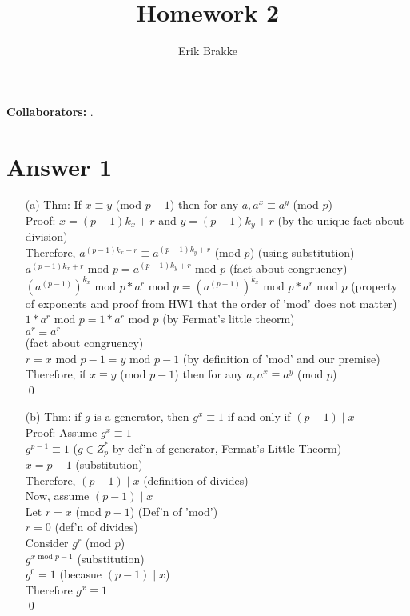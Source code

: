 \documentclass[11pt]{article}
\providecommand{\myparab}[1]{\smallskip\noindent\textbf{#1} }
\theoremstyle{definition}
\begin{document}
\title{Homework 2}
\author{Erik Brakke}
\maketitle

\thispagestyle{fancy}

\myparab{Collaborators: }  .
 
 
\section*{Answer 1}
\begin{enumerate}
	\item[(a)]
	Thm: If $x \equiv y$ (mod $p-1$) then for any $a, a^x \equiv a^y$ (mod $p$)\\
	\newline
	Proof:  $x = (p-1)k_x + r$ and $y = (p-1)k_y + r$ (by the unique fact about division)\\
	Therefore, $a^{(p-1)k_x + r} \equiv a^{(p-1)k_y + r}$ (mod $p$) (using substitution)\\
	$a^{(p-1)k_x + r} \text{ mod } p = a^{(p-1)k_y + r} \text{ mod } p$ (fact about congruency)\\
	$(a^{(p-1)})^{k_x} \text{ mod } p * a^r \text{ mod } p = (a^{(p-1)})^{k_x} \text{ mod } p * a^r \text{ mod } p$ (property of exponents and proof from HW1 that the order of 'mod' does not matter)\\
	$1 * a^r \text{ mod } p = 1 * a^r \text{ mod } p$ (by Fermat's little theorm)\\
	$a^r \equiv a^r$\\ (fact about congruency)\\
	$r = x \text{ mod } p-1 = y \text{ mod } p-1$ (by definition of 'mod' and our premise)\\
	Therefore, if $x \equiv y$ (mod $p-1$) then for any $a, a^x \equiv a^y$ (mod $p$)\\
	\qed

	\item[(b)]
	Thm: if $g$ is a generator, then $g^x \equiv 1$ if and only if $(p-1) \mid x$\\
	\newline
	Proof: Assume $g^x \equiv 1$\\
	$g^{p-1} \equiv 1$ ($g \in Z^*_p$ by def'n of generator, Fermat's Little Theorm)\\
	$x = p-1$ (substitution)\\
	Therefore, $(p-1) \mid x$ (definition of divides)\\
	\newline
	Now, assume $(p-1) \mid x$\\
	Let $r = x$ (mod $p-1$) (Def'n of 'mod')\\
	$r = 0$ (def'n of divides)\\
	Consider $g^r$ (mod $p$)\\
	$g^{x \text{ mod } p-1}$ (substitution)\\
	$g^0 = 1$ (becasue $(p-1) \mid x$)\\
	Therefore $g^x \equiv 1$\\
	\qed


\end{enumerate}
\end{document}
